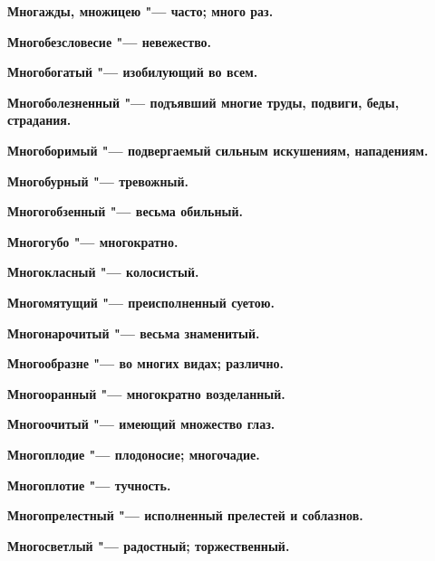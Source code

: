 \begin{mymulticols}{2}
\bfseries Многажды, множицею\normalfont{} "--- часто; много раз. 




\bfseries Многобезсловесие\normalfont{} "--- невежество. 




\bfseries Многобогатый\normalfont{} "--- изобилующий во всем. 




\bfseries Многоболезненный\normalfont{} "--- подъявший многие труды, подвиги, беды, страдания. 




\bfseries Многоборимый\normalfont{} "--- подвергаемый сильным искушениям, нападениям. 




\bfseries Многобурный\normalfont{} "--- тревожный. 




\bfseries Многогобзенный\normalfont{} "--- весьма обильный. 




\bfseries Многогубо\normalfont{} "--- многократно. 




\bfseries Многокласный\normalfont{} "--- колосистый. 




\bfseries Многомятущий\normalfont{} "--- преисполненный суетою. 




\bfseries Многонарочитый\normalfont{} "--- весьма знаменитый. 




\bfseries Многообразне\normalfont{} "--- во многих видах; различно. 




\bfseries Многооранный\normalfont{} "--- многократно возделанный. 




\bfseries Многоочитый\normalfont{} "--- имеющий множество глаз. 




\bfseries Многоплодие\normalfont{} "--- плодоносие; многочадие. 




\bfseries Многоплотие\normalfont{} "--- тучность. 




\bfseries Многопрелестный\normalfont{} "--- исполненный прелестей и соблазнов. 




\bfseries Многосветлый\normalfont{} "--- радостный; торжественный. 





\end{mymulticols}
